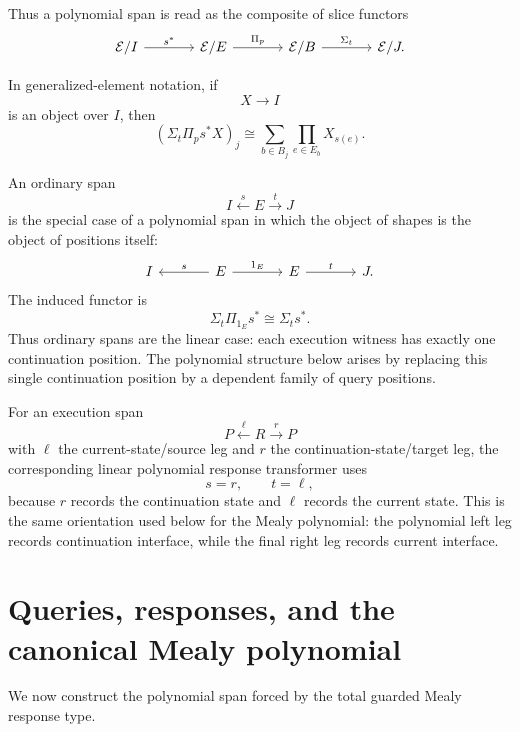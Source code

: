 Thus a polynomial span is read as the composite of slice functors
\[
\begin{tikzcd}[column sep=large]
\mathcal E/I
  \arrow[r, "s^\ast"]
&
\mathcal E/E
  \arrow[r, "\Pi_p"]
&
\mathcal E/B
  \arrow[r, "\Sigma_t"]
&
\mathcal E/J .
\end{tikzcd}
\]

In generalized-element notation, if
\[
X\to I
\]
is an object over \(I\), then
\[
\left(\Sigma_t\Pi_p s^\ast X\right)_j
\cong
\sum_{b\in B_j}
\prod_{e\in E_b}
X_{s(e)}.
\]

\begin{remark}
\label{rem:ordinary-spans-linear-polynomial-case}
An ordinary span
\[
I\xleftarrow{s}E\xrightarrow{t}J
\]
is the special case of a polynomial span in which the object of shapes is
the object of positions itself:
\[
\begin{tikzcd}[column sep=large]
I
&
E
  \arrow[l, "s"']
  \arrow[r, "1_E"]
&
E
  \arrow[r, "t"]
&
J .
\end{tikzcd}
\]
The induced functor is
\[
\Sigma_t\Pi_{1_E}s^\ast
\cong
\Sigma_t s^\ast.
\]
Thus ordinary spans are the linear case: each execution witness has
exactly one continuation position. The polynomial structure below arises
by replacing this single continuation position by a dependent family of
query positions.
\end{remark}

\begin{remark}
\label{rem:linear-polynomial-execution-orientation}
For an execution span
\[
P\xleftarrow{\ell}R\xrightarrow{r}P
\]
with \(\ell\) the current-state/source leg and \(r\) the
continuation-state/target leg, the corresponding linear polynomial
response transformer uses
\[
s=r,
\qquad
t=\ell,
\]
because \(r\) records the continuation state and \(\ell\) records the
current state. This is the same orientation used below for the Mealy
polynomial: the polynomial left leg records continuation interface, while
the final right leg records current interface.
\end{remark}

\section{Queries, responses, and the canonical Mealy polynomial}
\label{sec:queries-responses-canonical-mealy-polynomial}

We now construct the polynomial span forced by the total guarded Mealy
response type.

